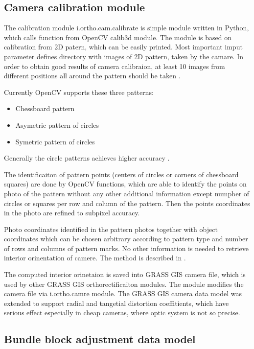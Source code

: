 \documentclass[a4paper,12pt]{report}
\begin{document}
\subsection{Camera calibration module}

The calibration module i.ortho.cam.calibrate is simple module written in Python, which calls
function from OpenCV calib3d module. The module is based on calibration from 2D patern, which can 
be easily printed. Most important imput parameter defines directory with images of 2D pattern, 
taken by the camare. In order to obtain good results of camera calibraion, at least 10 images 
from different positions all around the pattern should be taken \cite{camera_calibration2013opencv}.

Currently OpenCV supports these three patterns:
\begin{itemize}
\item Chessboard pattern 
\item Asymetric pattern of circles
\item Symetric pattern of circles
\end{itemize}

Generally the circle patterns achieves higher accuracy \cite{camera_calibration2013opencv}.

The identificaiton of pattern points (centers of circles or corners of chessboard squares) 
are done by OpenCV functions, which are able to identify the points on photo of the pattern 
without any other additional information except numpber of circles or squares per row and column
of the pattern. Then the points coordinates in the photo are refined to subpixel accuracy.

Photo coordinates identified in the pattern photos together with object coordinates which can be chosen
arbitrary according to pattern type and number of rows and columns of pattern marks. 
No other information is needed to retrieve interior orinentation of camere. The method is described 
in \cite{zhang2000flexible}.

The computed interior orinetaion is saved into GRASS GIS camera file, which is used by other GRASS GIS 
orthorectificaiton modules. The module modifies the camera file via i.ortho.camre module.
The GRASS GIS camera data model was extended to support radial and tangetial distortion coeffitients, which 
have serious effect especially in cheap cameras, where optic system is not so precise.

\subsection{Bundle block adjustment data model}
 
\end{document}
